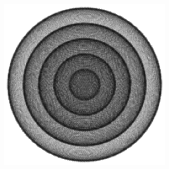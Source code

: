 \documentclass[9pt]{beamer}
\begin{document}
\begin{frame}
\begin{columns}
\begin{figure}

\end{figure}
\vspace{-2cm}
\begin{figure}
\includegraphics[width=1\textwidth]{sphereideal.eps}
\end{figure}
\end{columns}
\end{frame}
\end{document}
